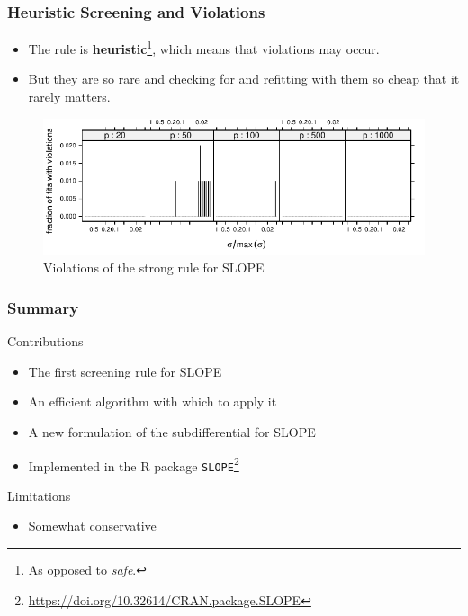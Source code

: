 \documentclass[10pt]{beamer}
\begin{document}
\begin{frame}[c]
  \frametitle{Heuristic Screening and Violations}

  \begin{itemize}
    \item The rule is \textbf{heuristic}\footnote{As opposed to \emph{safe}.}, which means that
          \alert{violations} may occur.
    \item But they are so rare and checking for and refitting with them so cheap that it rarely
          matters.
  \end{itemize}

  \pause

  \begin{figure}[htpb]
    \centering
    \includegraphics[width=\textwidth]{figures/paper1-violations.pdf}
    \caption{%
      Violations of the strong rule for SLOPE
    }
  \end{figure}

\end{frame}

\begin{frame}[c]
  \frametitle{Summary}

  \begin{exampleblock}{Contributions}
    \begin{itemize}
      \item The first screening rule for SLOPE
      \item An efficient algorithm with which to apply it
      \item A new formulation of the subdifferential for SLOPE
      \item Implemented in the R package
            \texttt{SLOPE}\footnote{\url{https://doi.org/10.32614/CRAN.package.SLOPE}}

    \end{itemize}
  \end{exampleblock}

  \pause

  \begin{alertblock}{Limitations}
    \begin{itemize}
      \item Somewhat conservative
    \end{itemize}
  \end{alertblock}
\end{frame}
\end{document}

